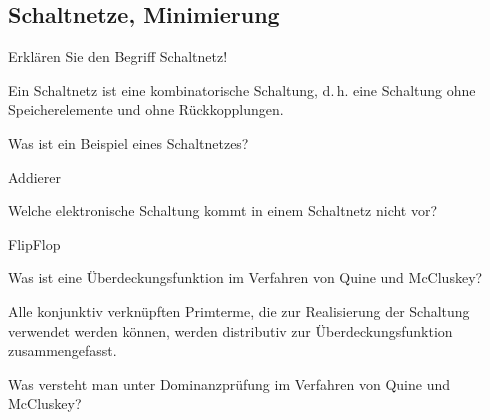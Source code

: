 \documentclass
[
  draft    = true,
  fontsize = 11pt,
  parskip  = half-,
  BCOR     = 0pt,
  DIV      = 11,
  ngerman,
  dvipsnames
]
{scrartcl}
\begin{document}
\subsection*{Schaltnetze, Minimierung}
\begin{mytemize}
  \item Erklären Sie den Begriff Schaltnetz!
        \begin{achim}
          \begin{mytemize}
            \item Ein Schaltnetz ist eine kombinatorische Schaltung, d.\,h.
                  eine Schaltung ohne Speicherelemente und ohne Rückkopplungen.
          \end{mytemize}
        \end{achim}
        \begin{mytemize}
          \item Was ist ein Beispiel eines Schaltnetzes?
                \begin{achim}
                  \begin{mytemize}
                    \item Addierer
                  \end{mytemize}
                \end{achim}
          \item Welche elektronische Schaltung kommt in einem Schaltnetz nicht vor?
                \begin{achim}
                  \begin{mytemize}
                    \item FlipFlop
                  \end{mytemize}
                \end{achim}
        \end{mytemize}
  \item Was ist eine Überdeckungsfunktion im Verfahren von Quine und McCluskey?
        \begin{achim}
          \begin{mytemize}
            \item Alle konjunktiv verknüpften Primterme, die zur
                  Realisierung der Schaltung verwendet werden können, werden
                  distributiv zur Überdeckungsfunktion zusammengefasst.
          \end{mytemize}
        \end{achim}
  \item Was versteht man unter Dominanzprüfung im Verfahren von Quine und McCluskey?

\end{mytemize}
\end{document}
